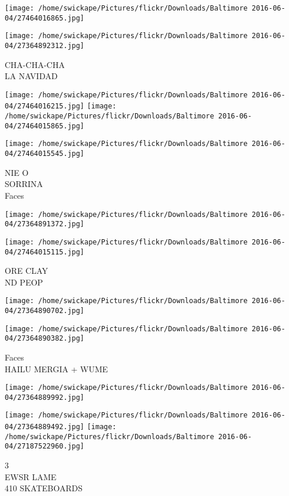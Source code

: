 \documentclass[10pt,letterpaper]{article}
\begin{document}
\texttt{[image: /home/swickape/Pictures/flickr/Downloads/Baltimore 2016-06-04/27464016865.jpg]}

\vspace{0.25in}
\texttt{[image: /home/swickape/Pictures/flickr/Downloads/Baltimore 2016-06-04/27364892312.jpg]}

CHA{-}CHA{-}CHA\\
LA NAVIDAD
\pagebreak

\texttt{[image: /home/swickape/Pictures/flickr/Downloads/Baltimore 2016-06-04/27464016215.jpg]}
\texttt{[image: /home/swickape/Pictures/flickr/Downloads/Baltimore 2016-06-04/27464015865.jpg]}

\vspace{0.25in}
\texttt{[image: /home/swickape/Pictures/flickr/Downloads/Baltimore 2016-06-04/27464015545.jpg]}

NIE O\\
SORRINA\\
Faces
\pagebreak

\texttt{[image: /home/swickape/Pictures/flickr/Downloads/Baltimore 2016-06-04/27364891372.jpg]}

\vspace{0.25in}
\texttt{[image: /home/swickape/Pictures/flickr/Downloads/Baltimore 2016-06-04/27464015115.jpg]}

ORE CLAY\\
ND PEOP
\pagebreak

\texttt{[image: /home/swickape/Pictures/flickr/Downloads/Baltimore 2016-06-04/27364890702.jpg]}

\vspace{0.25in}
\texttt{[image: /home/swickape/Pictures/flickr/Downloads/Baltimore 2016-06-04/27364890382.jpg]}

Faces\\
HAILU MERGIA + WUME
\pagebreak

\texttt{[image: /home/swickape/Pictures/flickr/Downloads/Baltimore 2016-06-04/27364889992.jpg]}

\vspace{0.25in}
\texttt{[image: /home/swickape/Pictures/flickr/Downloads/Baltimore 2016-06-04/27364889492.jpg]}
\texttt{[image: /home/swickape/Pictures/flickr/Downloads/Baltimore 2016-06-04/27187522960.jpg]}

3\\
EWSR LAME\\
410 SKATEBOARDS
\pagebreak
\end{document}

